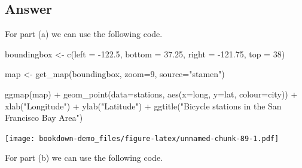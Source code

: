 \documentclass[
]{book}
\newenvironment{Shaded}{\begin{snugshade}}{\end{snugshade}}
\newcommand{\AttributeTok}[1]{\textcolor[rgb]{0.77,0.63,0.00}{#1}}
\newcommand{\DecValTok}[1]{\textcolor[rgb]{0.00,0.00,0.81}{#1}}
\newcommand{\FloatTok}[1]{\textcolor[rgb]{0.00,0.00,0.81}{#1}}
\newcommand{\FunctionTok}[1]{\textcolor[rgb]{0.00,0.00,0.00}{#1}}
\newcommand{\NormalTok}[1]{#1}
\newcommand{\OtherTok}[1]{\textcolor[rgb]{0.56,0.35,0.01}{#1}}
\newcommand{\SpecialCharTok}[1]{\textcolor[rgb]{0.00,0.00,0.00}{#1}}
\newcommand{\StringTok}[1]{\textcolor[rgb]{0.31,0.60,0.02}{#1}}
\begin{document}
\hypertarget{answer-7}{%
\subsection{Answer}\label{answer-7}}

For part (a) we can use the following code.

\begin{Shaded}
\begin{Highlighting}[]
\NormalTok{boundingbox }\OtherTok{\textless{}{-}} \FunctionTok{c}\NormalTok{(}\AttributeTok{left =} \SpecialCharTok{{-}}\FloatTok{122.5}\NormalTok{, }\AttributeTok{bottom =} \FloatTok{37.25}\NormalTok{, }\AttributeTok{right =} \SpecialCharTok{{-}}\FloatTok{121.75}\NormalTok{, }\AttributeTok{top =} \DecValTok{38}\NormalTok{)}

\NormalTok{map }\OtherTok{\textless{}{-}} \FunctionTok{get\_map}\NormalTok{(boundingbox, }\AttributeTok{zoom=}\DecValTok{9}\NormalTok{, }\AttributeTok{source=}\StringTok{"stamen"}\NormalTok{)}

\FunctionTok{ggmap}\NormalTok{(map) }\SpecialCharTok{+} 
    \FunctionTok{geom\_point}\NormalTok{(}\AttributeTok{data=}\NormalTok{stations, }\FunctionTok{aes}\NormalTok{(}\AttributeTok{x=}\NormalTok{long, }\AttributeTok{y=}\NormalTok{lat,  }\AttributeTok{colour=}\NormalTok{city)) }\SpecialCharTok{+}
    \FunctionTok{xlab}\NormalTok{(}\StringTok{"Longitude"}\NormalTok{) }\SpecialCharTok{+} \FunctionTok{ylab}\NormalTok{(}\StringTok{"Latitude"}\NormalTok{) }\SpecialCharTok{+} 
    \FunctionTok{ggtitle}\NormalTok{(}\StringTok{"Bicycle stations in the San Francisco Bay Area"}\NormalTok{)}
\end{Highlighting}
\end{Shaded}

\texttt{[image: bookdown-demo\_files/figure-latex/unnamed-chunk-89-1.pdf]}

For part (b) we can use the following code.
\end{document}
